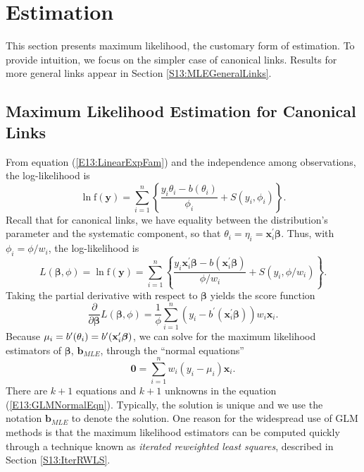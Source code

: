 \section{Estimation}\label{S13:Estimation}

This section presents maximum likelihood, the customary form of
estimation. To provide intuition, we focus on the simpler case of
canonical links. Results for more general links appear in Section
\ref{S13:MLEGeneralLinks}.

\subsection{Maximum Likelihood Estimation for Canonical
Links}\label{S13:MLECanonLinks}


From equation (\ref{E13:LinearExpFam}) and the independence among
observations, the log-likelihood is
\begin{equation}\label{E13:LogLike}
\ln \mathrm{f}( \mathbf{y}) =\sum_{i=1}^n
 \left\{
\frac{y_i\theta_i-b(\theta_i)}{\phi _i}+S( y_i,\phi _i ) \right\} .
\end{equation}
Recall that for canonical links, we have equality between the
distribution's parameter and the systematic component, so that
$\theta_i=\eta _i=\mathbf{x}_i^{\mathbf{\prime }}\boldsymbol \beta$.
Thus, with $\phi _i=\phi /w_i$, the log-likelihood is
\begin{equation}\label{E13:LogLikeCanonLink}
L (\boldsymbol \beta, \phi ) = \ln \mathrm{f}( \mathbf{y})
=\sum_{i=1}^n \left\{ \frac{y_i\mathbf{x}
_i^{\mathbf{\prime }}\boldsymbol \beta-b(\mathbf{x}_i^{\mathbf{\prime }}%
\boldsymbol \beta)}{\phi / w_i}+S( y_i,\phi / w_i) \right\} .
\end{equation}
Taking the partial derivative with respect to $\boldsymbol \beta$
yields the score function
\begin{equation}\label{E13:GLMScore}
\frac{\partial }{\partial \boldsymbol \beta} L( \boldsymbol \beta,
\phi ) = \frac{1}{\phi} \sum_{i=1}^n \left( y_i-b^{\prime
}(\mathbf{x} _i^{\mathbf{\prime }}\boldsymbol \beta) \right) w_i
\mathbf{x}_i .
\end{equation}
Because $\mu _i=b^{\prime }(\theta_i)=b^{\prime }(\mathbf{x}_i^{%
\mathbf{\prime }}\boldsymbol \beta)$, we can solve for the maximum
likelihood estimators of $\boldsymbol \beta$, $\mathbf{b}_{MLE} $,
through the ``normal equations''
\begin{equation}\label{E13:GLMNormalEqn}
\mathbf{0}=\sum_{i=1}^n w_i \left( y_i-\mu _i\right) \mathbf{x}_i.
\end{equation} There are $k+1$ equations and $k+1$
unknowns in the equation (\ref{E13:GLMNormalEqn}). Typically, the
solution is unique and we use the notation $\mathbf{b}_{MLE}$ to
denote the solution. One reason for the widespread use of GLM
methods is that the maximum likelihood estimators can be computed
quickly through a technique known as \emph{iterated reweighted least
squares}, described in Section \ref{S13:IterRWLS}.

